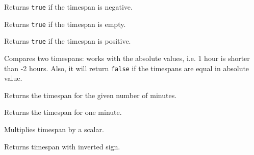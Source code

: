 
Returns {\tt true} if the timespan is negative.

\label{wxtimespanisnull}


Returns {\tt true} if the timespan is empty.

\label{wxtimespanispositive}


Returns {\tt true} if the timespan is positive.

\label{wxtimespanisshorterthan}


Compares two timespans: works with the absolute values, i.e. 1
hour is shorter than -2 hours. Also, it will return {\tt false} if
the timespans are equal in absolute value.

\label{wxtimespanminutes}


Returns the timespan for the given number of minutes.

\label{wxtimespanminute}


Returns the timespan for one minute.

\label{wxtimespanmultiply}




Multiplies timespan by a scalar.

\label{wxtimespannegate}


Returns timespan with inverted sign.

\label{wxtimespanneg}



